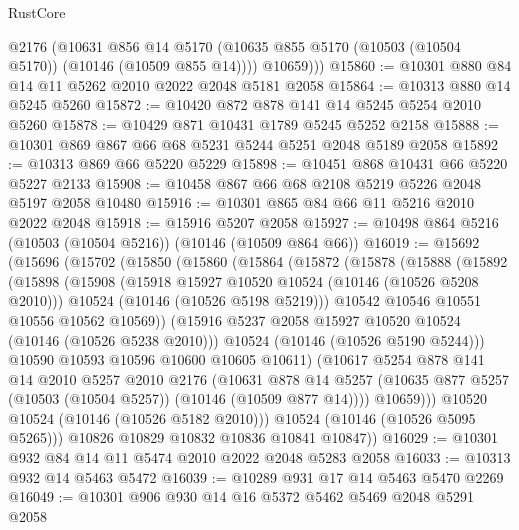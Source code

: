 \begin{lexlean}{RustCore}
\begin{coremodule}
          @2176
          (@10631
            @856
            @14
            @5170
            (@10635 @855 @5170 (@10503 (@10504 @5170)) (@10146 (@10509 @855 @14))))
          @10659)))
@15860 := @10301 @880 @84 @14 @11 @5262 @2010 @2022 @2048 @5181 @2058
@15864 := @10313 @880 @14 @5245 @5260
@15872 := @10420 @872 @878 @141 @14 @5245 @5254 @2010 @5260
@15878 := @10429 @871 @10431 @1789 @5245 @5252 @2158
@15888 := @10301 @869 @867 @66 @68 @5231 @5244 @5251 @2048 @5189 @2058
@15892 := @10313 @869 @66 @5220 @5229
@15898 := @10451 @868 @10431 @66 @5220 @5227 @2133
@15908 := @10458 @867 @66 @68 @2108 @5219 @5226 @2048 @5197 @2058 @10480
@15916 := @10301 @865 @84 @66 @11 @5216 @2010 @2022 @2048
@15918 := @15916 @5207 @2058
@15927 := @10498 @864 @5216 (@10503 (@10504 @5216)) (@10146 (@10509 @864 @66))
@16019 := @15692
    (@15696
      (@15702
        (@15850
          (@15860
            (@15864
              (@15872
                (@15878
                  (@15888
                    (@15892
                      (@15898
                        (@15908
                          (@15918 @15927 @10520 @10524 (@10146 (@10526 @5208 @2010)))
                          @10524
                          (@10146 (@10526 @5198 @5219)))
                        @10542
                        @10546
                        @10551
                        @10556
                        @10562
                        @10569))
                    (@15916 @5237 @2058 @15927 @10520 @10524 (@10146 (@10526 @5238 @2010)))
                    @10524
                    (@10146 (@10526 @5190 @5244)))
                  @10590
                  @10593
                  @10596
                  @10600
                  @10605
                  @10611)
                (@10617
                  @5254
                  @878
                  @141
                  @14
                  @2010
                  @5257
                  @2010
                  @2176
                  (@10631
                    @878
                    @14
                    @5257
                    (@10635 @877 @5257 (@10503 (@10504 @5257)) (@10146 (@10509 @877 @14))))
                  @10659)))
            @10520
            @10524
            (@10146 (@10526 @5182 @2010)))
          @10524
          (@10146 (@10526 @5095 @5265)))
        @10826
        @10829
        @10832
        @10836
        @10841
        @10847))
@16029 := @10301 @932 @84 @14 @11 @5474 @2010 @2022 @2048 @5283 @2058
@16033 := @10313 @932 @14 @5463 @5472
@16039 := @10289 @931 @17 @14 @5463 @5470 @2269
@16049 := @10301 @906 @930 @14 @16 @5372 @5462 @5469 @2048 @5291 @2058

\end{coremodule}
\end{lexlean}
